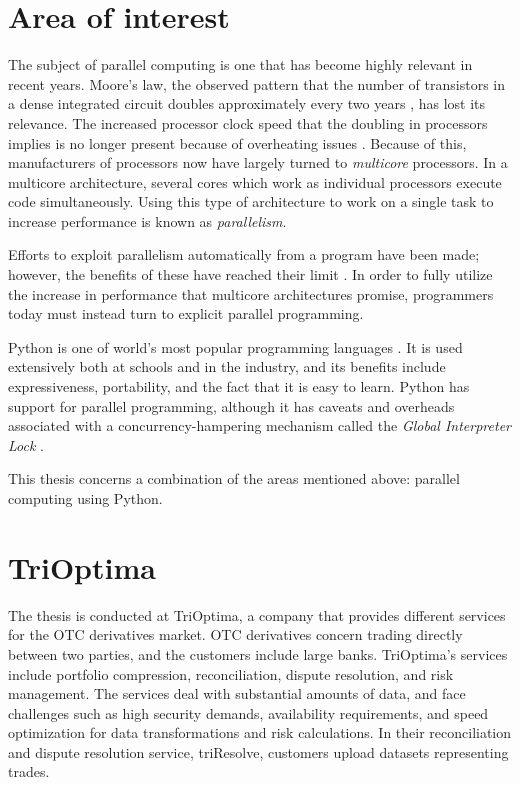 \section{Area of interest}
The subject of parallel computing is one that has become highly relevant in recent years.
Moore's law, the observed pattern that the number of transistors in a dense integrated circuit doubles approximately every two
years \cite{moore_1998_cramming_cmcoic},
has lost its relevance. The increased processor clock speed that the doubling in processors implies is no longer present because of
overheating issues \cite[p. 1]{herlihy_2012_art_taomprr}. Because of this, manufacturers of processors now have
largely turned to \emph{multicore} processors. In a multicore architecture, several cores which work as individual processors execute
code simultaneously. Using this type of architecture to work on a single task to increase performance is known as \emph{parallelism}.

Efforts to exploit parallelism automatically from a program have been made; however, the benefits of these have reached their
limit \cite[p. 7-12]{mccool_2012_structured_spppfec}. In order to fully utilize the increase in performance that multicore
architectures promise, programmers today must instead turn to explicit parallel programming.

Python is one of world's most popular programming languages \cite{krill_2015_python_psnhilp}. It is used extensively both at schools and
in the industry, and its benefits include expressiveness, portability, and the fact that it is easy to learn. Python has support for
parallel programming, although it has caveats and overheads associated with a concurrency-hampering mechanism called the
\emph{Global Interpreter Lock} \cite{beazley_150745UTC_introduction_aitpc}.

This thesis concerns a combination of the areas mentioned above: parallel computing using Python.

\section{TriOptima}
The thesis is conducted at TriOptima, a company that provides different services for the OTC derivatives market.
OTC derivatives concern trading directly between two parties, and the customers include large banks. TriOptima’s services
include portfolio compression, reconciliation, dispute resolution, and risk management. The services deal with substantial
amounts of data, and face challenges such as high security demands, availability requirements, and speed optimization
for data transformations and risk calculations. In their reconciliation and dispute resolution service,
triResolve, customers upload datasets representing trades. 

